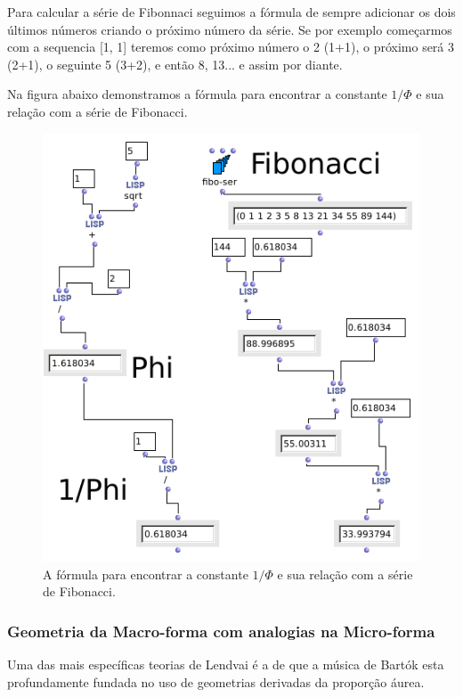 \documentclass[
	12pt,				%
	openright,			%
	twoside,			%
	a4paper,			%
	english,			%
	french,				%
	spanish,			%
	brazil				%
	]{abntex2}
\begin{document}
Para calcular a série de Fibonnaci seguimos a fórmula de sempre adicionar os dois últimos números criando o próximo número da série. Se por exemplo começarmos com a sequencia [1, 1] teremos como próximo número o 2 (1+1), o próximo será 3 (2+1), o seguinte 5 (3+2), e então 8, 13... e assim por diante. 

Na figura abaixo demonstramos a fórmula para encontrar a constante $1/\Phi$ e sua relação com a série de Fibonacci.

\begin{figure}[!h]
	\caption{\label{fig_grafico}A fórmula para encontrar a constante $1/\Phi$ e sua relação com a série de Fibonacci. }
	\begin{center}
	    \includegraphics[scale=0.5]{OM_settheory/aurea.png}
	\end{center}
\end{figure}	

\pagebreak
\subsubsection{Geometria da Macro-forma com analogias na Micro-forma}

Uma das mais específicas teorias de Lendvai é a de que a música de Bartók esta profundamente fundada no uso de geometrias derivadas da proporção áurea. 
\end{document}
